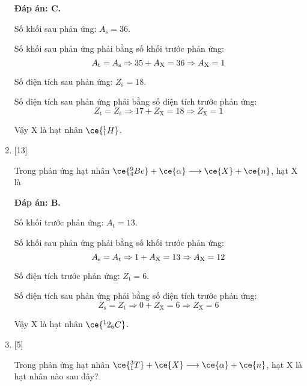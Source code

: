\begin{enumerate}[label=\bfseries Câu \arabic*:]
	\loigiai
	{		\textbf{Đáp án: C.}
		
		Số khối sau phản ứng: $A_\text{s} = 36$.
		
		Số khối sau phản ứng phải bằng số khối trước phản ứng:
		$$A_\text{t} = A_\text{s} \Rightarrow 35+A_\text X = 36 \Rightarrow A_\text X = 1$$
		
		Số điện tích sau phản ứng: $Z_\text{s} = 18$.
		
		Số điện tích sau phản ứng phải bằng số điện tích trước phản ứng:
		$$Z_\text{t} = Z_\text{s} \Rightarrow 17 + Z_\text{X} = 18 \Rightarrow Z_\text{X} = 1$$
		
		Vậy X là hạt nhân $\ce{^1_1 H}$.
		
	}
	\item {} [13]
	\cauhoi
	{Trong phản ứng hạt nhân $\ce{^9_4 Be} + \ce{\alpha} \longrightarrow \ce{X} + \ce{n}$, hạt X là
	}
	
	\loigiai
	{		\textbf{Đáp án: B.}
		
		Số khối trước phản ứng: $A_\text{t} = 13$.
		
		Số khối sau phản ứng phải bằng số khối trước phản ứng:
		$$A_\text{s} = A_\text{t} \Rightarrow 1+A_\text X = 13 \Rightarrow A_\text X = 12$$
		
		Số điện tích trước phản ứng: $Z_\text{t} = 6$.
		
		Số điện tích sau phản ứng phải bằng số điện tích trước phản ứng:
		$$Z_\text{s} = Z_\text{t} \Rightarrow 0 + Z_\text{X} = 6 \Rightarrow Z_\text{X} = 6$$
		
		Vậy X là hạt nhân $\ce{^12_6 C}$.
		
	}
	\item {} [5]
	\cauhoi
	{Trong phản ứng hạt nhân $\ce{^3_1 T} + \ce{X} \longrightarrow \ce{\alpha} + \ce{n}$, hạt X là hạt nhân nào sau đây?
	}
	

\end{enumerate}
